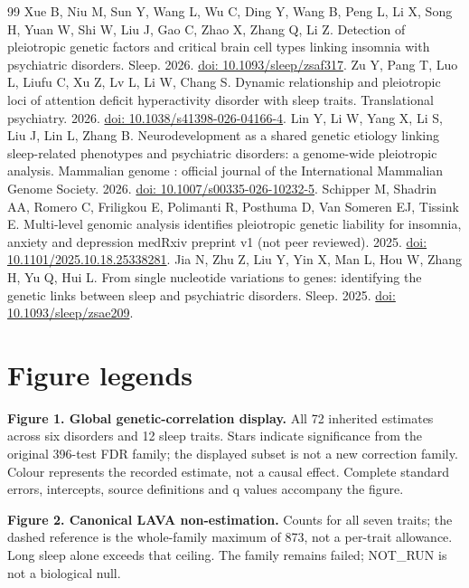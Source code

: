 \documentclass[11pt]{article}
\begin{document}
\begin{thebibliography}{99}
 Xue B, Niu M, Sun Y, Wang L, Wu C, Ding Y, Wang B, Peng L, Li X, Song H, Yuan W, Shi W, Liu J, Gao C, Zhao X, Zhang Q, Li Z. Detection of pleiotropic genetic factors and critical brain cell types linking insomnia with psychiatric disorders. Sleep. 2026. \href{https://doi.org/10.1093/sleep/zsaf317}{doi: 10.1093/sleep/zsaf317}.
 Zu Y, Pang T, Luo L, Liufu C, Xu Z, Lv L, Li W, Chang S. Dynamic relationship and pleiotropic loci of attention deficit hyperactivity disorder with sleep traits. Translational psychiatry. 2026. \href{https://doi.org/10.1038/s41398-026-04166-4}{doi: 10.1038/s41398-026-04166-4}.
 Lin Y, Li W, Yang X, Li S, Liu J, Lin L, Zhang B. Neurodevelopment as a shared genetic etiology linking sleep-related phenotypes and psychiatric disorders: a genome-wide pleiotropic analysis. Mammalian genome : official journal of the International Mammalian Genome Society. 2026. \href{https://doi.org/10.1007/s00335-026-10232-5}{doi: 10.1007/s00335-026-10232-5}.
 Schipper M, Shadrin AA, Romero C, Friligkou E, Polimanti R, Posthuma D, Van Someren EJ, Tissink E. Multi-level genomic analysis identifies pleiotropic genetic liability for insomnia, anxiety and depression medRxiv preprint v1 (not peer reviewed). 2025. \href{https://doi.org/10.1101/2025.10.18.25338281}{doi: 10.1101/2025.10.18.25338281}.
 Jia N, Zhu Z, Liu Y, Yin X, Man L, Hou W, Zhang H, Yu Q, Hui L. From single nucleotide variations to genes: identifying the genetic links between sleep and psychiatric disorders. Sleep. 2025. \href{https://doi.org/10.1093/sleep/zsae209}{doi: 10.1093/sleep/zsae209}.
\end{thebibliography}

\section*{Figure legends}
\textbf{Figure 1. Global genetic-correlation display.} All 72 inherited estimates across six disorders and 12 sleep traits. Stars indicate significance from the original 396-test FDR family; the displayed subset is not a new correction family. Colour represents the recorded estimate, not a causal effect. Complete standard errors, intercepts, source definitions and q values accompany the figure.

\textbf{Figure 2. Canonical LAVA non-estimation.} Counts for all seven traits; the dashed reference is the whole-family maximum of 873, not a per-trait allowance. Long sleep alone exceeds that ceiling. The family remains failed; NOT\_RUN is not a biological null.
\end{document}
